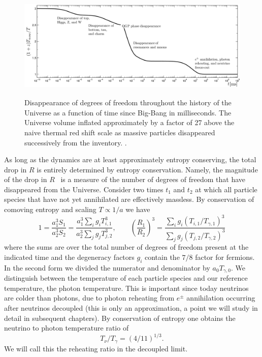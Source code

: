 \begin{figure} 
\centerline{\includegraphics[height=5.2cm]{01-introduction/Figures/DOFtime.png}}
\caption{Disappearance of degrees of freedom throughout the history of the Universe as a function of time since Big-Bang in milliseconds. The Universe volume inflated approximately by a factor of 27 above the naive thermal red shift scale as massive particles disappeared successively from the inventory. .\label{fig:dof}}
 \end{figure}



As long as the dynamics are at least approximately entropy conserving, the total drop in $R$ is entirely determined by entropy conservation. Namely, the magnitude of the drop in $R$~ is a measure of the number of degrees of freedom that have disappeared from the Universe. Consider two times $t_1$ and $t_2$ at which all particle species that have not yet annihilated are effectively massless. By conservation of comoving entropy and scaling $T\propto 1/a$ we have
\begin{equation}\label{r_ratio}
1=\frac{a_1^3S_{1}}{a_2^3 S_2}=\frac{a_1^3\sum_ig_i T_{i,1}^3}{a_2^3\sum_j g_j T_{j,2}^3},\qquad \left(\frac{R_1}{R_2}\right)^3=\frac{\sum_ig_i (T_{i,1}/T_{\gamma,1})^3}{\sum_j g_j (T_{j,2}/T_{\gamma,2})^3}
\end{equation}
where the sums are over the total number of degrees of freedom present at the indicated time and the degeneracy factors $g_i$ contain the $7/8$ factor for fermions. In the second form we divided the numerator and denominator by $a_{0}T_{\gamma,0}$. We distinguish between the temperature of each particle species and our reference temperature, the photon temperature. This is important since today neutrinos are colder than photons, due to photon reheating from $e^\pm$ annihilation occurring after neutrinos decoupled (this is only an approximation, a point we will study in detail in subsequent chapters). By conservation of entropy one obtains the neutrino to photon temperature ratio of
\begin{equation}\label{T_nu_T_gamma}
T_\nu/T_\gamma=({4}/{11})^{1/3}.
\end{equation}
We will call this the reheating ratio in the decoupled limit. 

